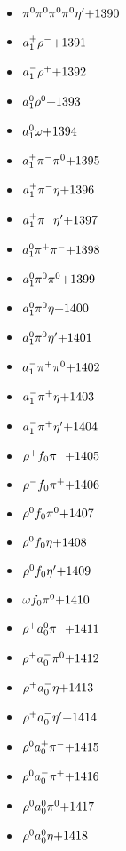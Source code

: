 \begin{multicols}{3}
\begin{itemize}
 \item $ \pi^{0} \pi^{0} \pi^{0} \pi^{0} {\eta^{\prime}} \hfill{+1390}$
 \item $ a_{1}^{+} \rho^{-} \hfill{+1391}$
 \item $ a_{1}^{-} \rho^{+} \hfill{+1392}$
 \item $ a_{1}^{0} \rho^{0} \hfill{+1393}$
 \item $ a_{1}^{0} \omega \hfill{+1394}$
 \item $ a_{1}^{+} \pi^{-} \pi^{0} \hfill{+1395}$
 \item $ a_{1}^{+} \pi^{-} \eta \hfill{+1396}$
 \item $ a_{1}^{+} \pi^{-} {\eta^{\prime}} \hfill{+1397}$
 \item $ a_{1}^{0} \pi^{+} \pi^{-} \hfill{+1398}$
 \item $ a_{1}^{0} \pi^{0} \pi^{0} \hfill{+1399}$
 \item $ a_{1}^{0} \pi^{0} \eta \hfill{+1400}$
 \item $ a_{1}^{0} \pi^{0} {\eta^{\prime}} \hfill{+1401}$
 \item $ a_{1}^{-} \pi^{+} \pi^{0} \hfill{+1402}$
 \item $ a_{1}^{-} \pi^{+} \eta \hfill{+1403}$
 \item $ a_{1}^{-} \pi^{+} {\eta^{\prime}} \hfill{+1404}$
 \item $ \rho^{+} f_{0} \pi^{-} \hfill{+1405}$
 \item $ \rho^{-} f_{0} \pi^{+} \hfill{+1406}$
 \item $ \rho^{0} f_{0} \pi^{0} \hfill{+1407}$
 \item $ \rho^{0} f_{0} \eta \hfill{+1408}$
 \item $ \rho^{0} f_{0} {\eta^{\prime}} \hfill{+1409}$
 \item $ \omega f_{0} \pi^{0} \hfill{+1410}$
 \item $ \rho^{+} a_{0}^{0} \pi^{-} \hfill{+1411}$
 \item $ \rho^{+} a_{0}^{-} \pi^{0} \hfill{+1412}$
 \item $ \rho^{+} a_{0}^{-} \eta \hfill{+1413}$
 \item $ \rho^{+} a_{0}^{-} {\eta^{\prime}} \hfill{+1414}$
 \item $ \rho^{0} a_{0}^{+} \pi^{-} \hfill{+1415}$
 \item $ \rho^{0} a_{0}^{-} \pi^{+} \hfill{+1416}$
 \item $ \rho^{0} a_{0}^{0} \pi^{0} \hfill{+1417}$
 \item $ \rho^{0} a_{0}^{0} \eta \hfill{+1418}$

\end{itemize}
\end{multicols}
